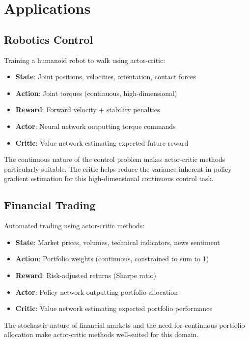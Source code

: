 \section{Applications}

\subsection{Robotics Control}

\begin{examplebox}
Training a humanoid robot to walk using actor-critic:
\begin{itemize}
    \item \textbf{State}: Joint positions, velocities, orientation, contact forces
    \item \textbf{Action}: Joint torques (continuous, high-dimensional)
    \item \textbf{Reward}: Forward velocity + stability penalties
    \item \textbf{Actor}: Neural network outputting torque commands
    \item \textbf{Critic}: Value network estimating expected future reward
\end{itemize}

The continuous nature of the control problem makes actor-critic methods particularly suitable. The critic helps reduce the variance inherent in policy gradient estimation for this high-dimensional continuous control task.
\end{examplebox}

\subsection{Financial Trading}

\begin{examplebox}
Automated trading using actor-critic methods:
\begin{itemize}
    \item \textbf{State}: Market prices, volumes, technical indicators, news sentiment
    \item \textbf{Action}: Portfolio weights (continuous, constrained to sum to 1)
    \item \textbf{Reward}: Risk-adjusted returns (Sharpe ratio)
    \item \textbf{Actor}: Policy network outputting portfolio allocation
    \item \textbf{Critic}: Value network estimating expected portfolio performance
\end{itemize}

The stochastic nature of financial markets and the need for continuous portfolio allocation make actor-critic methods well-suited for this domain.
\end{examplebox}

